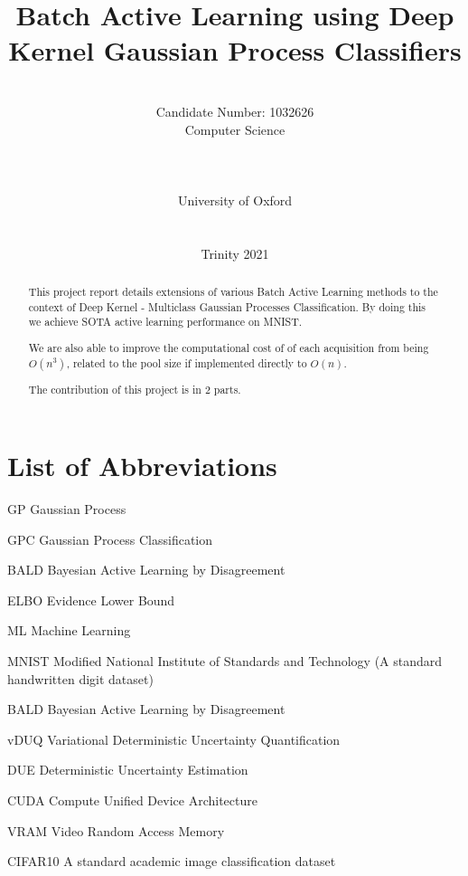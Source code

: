 \documentclass[12pt, a4paper]{report}
\date{}
\title{Batch Active Learning using Deep Kernel Gaussian Process Classifiers}
\author{\\ \Large{Candidate Number: 1032626}
\\ Computer Science
\\
\\
\\
\\ University of Oxford
\\
\\ \\
Trinity 2021
}
\theoremstyle{definition}
\theoremstyle{definition}
\theoremstyle{definition}
\begin{document}

\thispagestyle{headings}
	\maketitle
\FloatBarrier
{}


\thispagestyle{empty}


\begin{abstract}

This project report details extensions of various Batch Active Learning methods to the context of Deep Kernel - Multiclass Gaussian Processes Classification. By doing this we achieve SOTA active learning performance on MNIST.

We are also able to improve the computational cost of of each acquisition from being $O(n^3)$, related to the pool size if implemented directly to $O(n)$.


The contribution of this project is in 2 parts.


\end{abstract}
\tableofcontents
\thispagestyle{plain}
\listoffigures
\listoftables
\listofalgocfs
\listoftheorems
\chapter*{List of Abbreviations}
\begin{abbreviations}
    \item[GP] Gaussian Process
    \item[GPC] Gaussian Process Classification
    \item[BALD] Bayesian Active Learning by Disagreement
    \item[ELBO] Evidence Lower Bound
    \item[ML] Machine Learning
    \item[MNIST] Modified National Institute of Standards and Technology (A standard handwritten digit dataset)
    \item[BALD] Bayesian Active Learning by Disagreement
    \item[vDUQ] Variational Deterministic Uncertainty Quantification
    \item[DUE]   Deterministic Uncertainty Estimation
    \item[CUDA] Compute Unified Device Architecture
    \item[VRAM] Video Random Access Memory  
    \item[CIFAR10] A standard academic image classification dataset 
\end{abbreviations}
\end{document}
